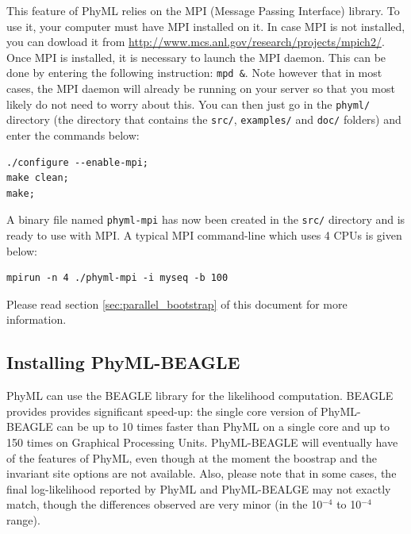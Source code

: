 \documentclass[a4paper,12pt]{article}
\newcommand{\x}[1]{\texttt{#1}}
\begin{document}
This  feature of  PhyML relies  on the  MPI (Message  Passing Interface)  library. To  use  it, your
computer must  have MPI  installed on  it. In case  MPI is  not installed, you  can dowload  it from
\href{http://www.mcs.anl.gov/research/projects/mpich2/}{http://www.mcs.anl.gov/research/projects/mpich2/}.
Once MPI is  installed, it is necessary to launch  the MPI daemon. This can be  done by entering the
following instruction: \x{mpd \&}.  Note however that in most cases, the  MPI daemon will already be
running on your server so  that you most likely do not need to worry  about this. You can then just
go in the \x{phyml/} directory (the directory that contains the \x{src/}, \x{examples/} and \x{doc/}
folders) and enter the commands below:

{\setlength{\baselineskip}{0.5\baselineskip}
\begin{verbatim}
./configure --enable-mpi;
make clean;
make;
\end{verbatim}
}

A binary file named \x{phyml-mpi} has now been created in the \x{src/} directory and is ready to use
with MPI. A typical MPI command-line which uses 4 CPUs is given below:

{\setlength{\baselineskip}{0.5\baselineskip}
\begin{verbatim}
mpirun -n 4 ./phyml-mpi -i myseq -b 100
\end{verbatim}
}

\noindent Please read section \ref{sec:parallel_bootstrap} of this document for more information.

\subsection{Installing PhyML-BEAGLE}\label{sec:install-phyml-beagle}

PhyML  can use  the  BEAGLE\cite{ayres12}  library for  the  likelihood computation.  BEAGLE
provides provides  significant speed-up: the  single core  version of PhyML-BEAGLE  can be up  to 10
times  faster  than  PhyML  on  a  single   core  and  up  to  150  times  on  Graphical  Processing
Units. PhyML-BEAGLE  will eventually have of  the features of PhyML,  even though at  the moment the
boostrap and the invariant site options are not available. Also, please note that in some cases, the
final  log-likelihood  reported  by  PhyML  and  PhyML-BEALGE may  not  exactly  match,  though  the
differences observed are very minor (in the 10$^{-4}$ to 10$^{-4}$ range).
\end{document}
